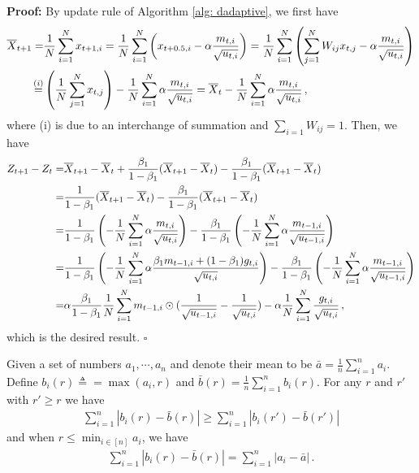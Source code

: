 \documentclass[anon,12pt]{colt2021} %
\begin{document}
\textbf{Proof:} By update rule of Algorithm \ref{alg: dadaptive}, we first have
\begin{align}\notag
\begin{split}
\overline X_{t+1}  = & \frac{1}{N}\sum_{i=1}^N x_{t+1,i}  =  \frac{1}{N}\sum_{i=1}^N \left( x_{t+0.5,i} - \alpha \frac{m_{t,i}}{\sqrt{u_{t,i}}}\right)  =  \frac{1}{N}\sum_{i=1}^N \left(  \sum_{j=1}^N W_{ij}x_{t,j} - \alpha \frac{m_{t,i}}{\sqrt{u_{t,i}}}\right)    \\
\overset{(i)}{=} &  \left(\frac{1}{N} \sum_{j=1}^N x_{t,j} \right) -\frac{1}{N} \sum_{i=1}^N   \alpha \frac{m_{t,i}}{\sqrt{u_{t,i}}}  =  \overline X_t - \frac{1}{N} \sum_{i=1}^N   \alpha \frac{m_{t,i}}{\sqrt{u_{t,i}}} \, ,
\end{split}
\end{align}
where (i) is due to an interchange of summation and $\sum_{i=1} W_{ij} = 1$.
Then, we have 
\begin{align}\notag
\begin{split}
Z_{t+1} - Z_t =& \overline X_{t+1} - \overline X_{t} + \frac{\beta_1}{1-\beta_1} (\overline X_{t+1}- \overline X_t) - \frac{\beta_1}{1-\beta_1} (\overline X_{t+1}- \overline X_t)  \\
= &  \frac{1}{1-\beta_1} (\overline X_{t+1}- \overline X_t) - \frac{\beta_1}{1-\beta_1} (\overline X_{t+1}- \overline X_t)  \\
= & \frac{1}{1-\beta_1} \left(- \frac{1}{N} \sum_{i=1}^N   \alpha \frac{m_{t,i}}{\sqrt{u_{t,i}}}\right) - \frac{\beta_1}{1-\beta_1} \left(- \frac{1}{N} \sum_{i=1}^N   \alpha \frac{m_{t-1,i}}{\sqrt{u_{t-1,i}}}\right)  \\
= & \frac{1}{1-\beta_1} \left(- \frac{1}{N} \sum_{i=1}^N   \alpha \frac{\beta_1 m_{t-1,i} + (1-\beta_1) g_{t,i}}{\sqrt{u_{t,i}}}\right) - \frac{\beta_1}{1-\beta_1} \left(- \frac{1}{N} \sum_{i=1}^N   \alpha \frac{m_{t-1,i}}{\sqrt{u_{t-1,i}}}\right)  \\
= & \alpha \frac{\beta_1}{1-\beta_1}  \frac{1}{N} \sum_{i=1}^N m_{t-1	,i} \odot (\frac{1}{\sqrt{u_{t-1,i}}} - \frac{1}{\sqrt{u_{t,i}}}) - \alpha \frac{1}{N} \sum_{i=1}^N \frac{g_{t,i}}{\sqrt{u_{t,i}}} \, ,
\end{split}
\end{align}
which is the desired result. \hfill $\square$


\begin{lemma}\label{lem: mean_after_max}
	Given  a set of numbers $a_1,\cdots,a_n$ and denote their mean to be $\bar a = \frac{1}{n}\sum_{i=1}^n a_i$. Define $b_i(r) \triangleq = \max(a_i,r)$ and $\bar b (r) =  \frac{1}{n}\sum_{i=1}^n b_i(r)$. For any $r$ and $r'$ with $r' \geq r$ we have 
	\begin{align}\label{eq: r_decrease}
	\sum_{i=1}^n |b_i(r) - \bar b(r)| \geq \sum_{i=1}^n |b_i(r') - \bar b(r')|
	\end{align}
	and when $r \leq \min_{i \in [n]} a_i$, we have
	\begin{align}\label{eq: r_reduce}
	\sum_{i=1}^n |b_i(r) - \bar b(r)| =   \sum_{i=1}^n |a_i - \bar a| \, .
	\end{align}
\end{lemma}
\end{document}
